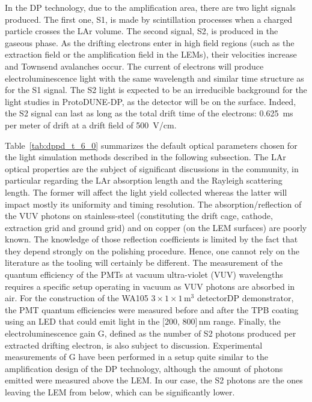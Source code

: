 In the DP technology, due to the amplification area, there are two light signals produced. The first one, S1, is made by scintillation processes when a charged particle crosses the LAr volume. The second signal, S2, is produced in the gaseous phase. As the drifting electrons enter in high field regions (such as the extraction field or the amplification field in the LEMs), their velocities increase and Townsend avalanches occur. The current of electrons will produce electroluminescence light with the same wavelength and similar time structure as for the S1 signal. %
The S2 light is expected to be an irreducible background for the light studies in ProtoDUNE-DP, as the detector will be on the surface. Indeed, the S2 signal can last as long as the total drift time of the electrons: \SI{0.625}{ms} per meter of drift at a drift field of \SI{500}{V/cm}.

Table~\ref{tab:dppd_t_6_0} summarizes the default optical parameters chosen for the light simulation methods described in the following subsection. The LAr optical properties are the subject of significant discussions in the community, in particular regarding the LAr absorption length and the Rayleigh scattering length. The former will affect the light yield collected whereas the latter will impact mostly its uniformity and timing resolution. The absorption/reflection of the VUV photons on stainless-steel (constituting the drift cage, cathode, extraction grid and ground grid) and on copper (on the LEM surfaces) are poorly known. The knowledge of those reflection coefficients is limited by the fact that they depend strongly on the polishing procedure. Hence, one cannot rely on the literature as the tooling will certainly be different. The measurement of the quantum efficiency of the PMTs at vacuum ultra-violet (VUV) wavelengths requires a specific setup operating in vacuum as VUV photons are absorbed in air. For the construction of the  WA105 $3\times1\times1$\,m$^3$ detectorDP demonstrator, the PMT quantum efficiencies were measured before and after the TPB coating using an LED that could emit light in the [\num{200}, \num{800}]\,nm range. Finally, the electroluminescence gain G, defined as the number of S2 photons produced per extracted drifting electron, is also subject to discussion. Experimental measurements of G have been performed in a setup quite similar to the amplification design of the DP technology, although the amount of photons emitted were measured above the LEM. In our case, the S2 photons are the ones leaving the LEM from below, which can be significantly lower. 


